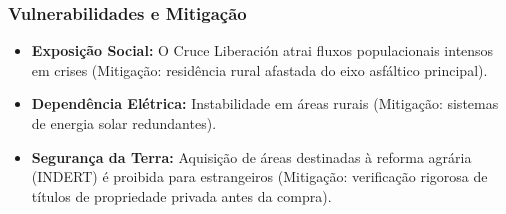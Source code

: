 \subsubsection{Vulnerabilidades e
Mitigação}

\begin{itemize}
\tightlist
\item
  \textbf{Exposição Social:} O Cruce Liberación atrai fluxos
  populacionais intensos em crises (Mitigação: residência rural afastada
  do eixo asfáltico principal).
\item
  \textbf{Dependência Elétrica:} Instabilidade em áreas rurais
  (Mitigação: sistemas de energia solar redundantes).
\item
  \textbf{Segurança da Terra:} Aquisição de áreas destinadas à reforma
  agrária (INDERT) é proibida para estrangeiros (Mitigação: verificação
  rigorosa de títulos de propriedade privada antes da compra).
\end{itemize}

